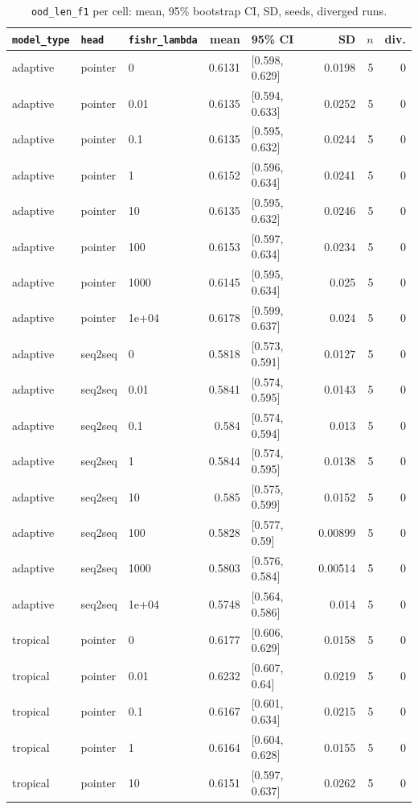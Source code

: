 \documentclass[10pt]{article}
\begin{document}
{\small
\begin{longtable}{lllrlrrr}
\caption{\texttt{ood\_len\_f1} per cell: mean, 95\% bootstrap CI, SD, seeds, diverged runs.}\label{tab:summary-ood_len_f1}\\
\toprule
\texttt{model\_type} & \texttt{head} & \texttt{fishr\_lambda} & mean & 95\% CI & SD & $n$ & div.\\
\midrule
\endhead
adaptive & pointer & 0 & 0.6131 & [0.598, 0.629] & 0.0198 & 5 & 0\\
adaptive & pointer & 0.01 & 0.6135 & [0.594, 0.633] & 0.0252 & 5 & 0\\
adaptive & pointer & 0.1 & 0.6135 & [0.595, 0.632] & 0.0244 & 5 & 0\\
adaptive & pointer & 1 & 0.6152 & [0.596, 0.634] & 0.0241 & 5 & 0\\
adaptive & pointer & 10 & 0.6135 & [0.595, 0.632] & 0.0246 & 5 & 0\\
adaptive & pointer & 100 & 0.6153 & [0.597, 0.634] & 0.0234 & 5 & 0\\
adaptive & pointer & 1000 & 0.6145 & [0.595, 0.634] & 0.025 & 5 & 0\\
adaptive & pointer & 1e+04 & 0.6178 & [0.599, 0.637] & 0.024 & 5 & 0\\
adaptive & seq2seq & 0 & 0.5818 & [0.573, 0.591] & 0.0127 & 5 & 0\\
adaptive & seq2seq & 0.01 & 0.5841 & [0.574, 0.595] & 0.0143 & 5 & 0\\
adaptive & seq2seq & 0.1 & 0.584 & [0.574, 0.594] & 0.013 & 5 & 0\\
adaptive & seq2seq & 1 & 0.5844 & [0.574, 0.595] & 0.0138 & 5 & 0\\
adaptive & seq2seq & 10 & 0.585 & [0.575, 0.599] & 0.0152 & 5 & 0\\
adaptive & seq2seq & 100 & 0.5828 & [0.577, 0.59] & 0.00899 & 5 & 0\\
adaptive & seq2seq & 1000 & 0.5803 & [0.576, 0.584] & 0.00514 & 5 & 0\\
adaptive & seq2seq & 1e+04 & 0.5748 & [0.564, 0.586] & 0.014 & 5 & 0\\
tropical & pointer & 0 & 0.6177 & [0.606, 0.629] & 0.0158 & 5 & 0\\
tropical & pointer & 0.01 & 0.6232 & [0.607, 0.64] & 0.0219 & 5 & 0\\
tropical & pointer & 0.1 & 0.6167 & [0.601, 0.634] & 0.0215 & 5 & 0\\
tropical & pointer & 1 & 0.6164 & [0.604, 0.628] & 0.0155 & 5 & 0\\
tropical & pointer & 10 & 0.6151 & [0.597, 0.637] & 0.0262 & 5 & 0\\

\end{longtable}}
\end{document}
